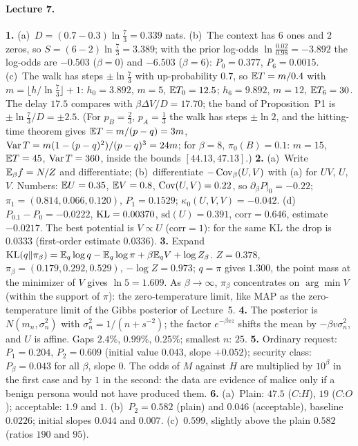 \paragraph{Lecture 7.}
\textbf{1.} (a)~$D=(0.7-0.3)\ln\frac73=0.339$ nats. (b)~The context has $6$ ones and $2$ zeros, so $S=(6-2)\ln\frac73=3.389$; with the prior log-odds $\ln\frac{0.02}{0.98}=-3.892$ the log-odds are $-0.503$ ($\beta=0$) and $-6.503$ ($\beta=6$): $P_0=0.377$, $P_6=0.0015$. (c)~The walk has steps $\pm\ln\frac73$ with up-probability $0.7$, so $\mathbb{E} T=m/0.4$ with $m=\lfloor h/\ln\frac73\rfloor+1$: $h_0=3.892$, $m=5$, $\mathbb{E} T_0=12.5$; $h_6=9.892$, $m=12$, $\mathbb{E} T_6=30$. The delay $17.5$ compares with $\beta\Delta V/D=17.70$; the band of Proposition~P1 is $\pm\ln\frac73/D=\pm2.5$. (For $p_B=\frac23$, $p_A=\frac13$ the walk has steps $\pm\ln2$, and the hitting-time theorem gives $\mathbb{E} T=m/(p-q)=3m$, $\operatorname{Var} T=m(1-(p-q)^2)/(p-q)^3=24m$; for $\beta=8$, $\pi_0(B)=0.1$: $m=15$, $\mathbb{E} T=45$, $\operatorname{Var} T=360$, inside the bounds $[44.13,47.13]$.) \quad
\textbf{2.} (a)~Write $\mathbb{E}_\beta f=N/Z$ and differentiate; (b)~differentiate $-\operatorname{Cov}_\beta(U,V)$ with (a) for $UV$, $U$, $V$. Numbers: $\mathbb{E} U=0.35$, $\mathbb{E} V=0.8$, $\operatorname{Cov}(U,V)=0.22$, so $\partial_\beta P|_0=-0.22$; $\pi_1=(0.814,0.066,0.120)$, $P_1=0.1529$; $\kappa_0(U,V,V)=-0.042$. (d)~$P_{0.1}-P_0=-0.0222$, $\operatorname{KL}=0.00370$, $\mathrm{sd}(U)=0.391$, $\mathrm{corr}=0.646$, estimate $-0.0217$. The best potential is $V\propto U$ ($\mathrm{corr}=1$): for the same KL the drop is $0.0333$ (first-order estimate $0.0336$). \quad
\textbf{3.} Expand $\operatorname{KL}(q\|\pi_\beta)=\mathbb{E}_q\log q-\mathbb{E}_q\log\pi+\beta\mathbb{E}_qV+\log Z_\beta$. $Z=0.378$, $\pi_\beta=(0.179,0.292,0.529)$, $-\log Z=0.973$; $q=\pi$ gives $1.300$, the point mass at the minimizer of $V$ gives $\ln5=1.609$. As $\beta\to\infty$, $\pi_\beta$ concentrates on $\arg\min V$ (within the support of $\pi$): the zero-temperature limit, like MAP as the zero-temperature limit of the Gibbs posterior of Lecture~5. \quad
\textbf{4.} The posterior is $N(m_n,\sigma_n^2)$ with $\sigma_n^2=1/(n+s^{-2})$; the factor $e^{-\beta vz}$ shifts the mean by $-\beta v\sigma_n^2$, and $U$ is affine. Gaps $2.4\%$, $0.99\%$, $0.25\%$; smallest $n$: $25$. \quad
\textbf{5.} Ordinary request: $P_1=0.204$, $P_2=0.609$ (initial value $0.043$, slope $+0.052$); security class: $P_\beta=0.043$ for all $\beta$, slope $0$. The odds of $M$ against $H$ are multiplied by $10^{\beta}$ in the first case and by $1$ in the second: the data are evidence of malice only if a benign persona would not have produced them. \quad
\textbf{6.} (a)~Plain: $47.5$ ($C$:$H$), $19$ ($C$:$O$); acceptable: $1.9$ and $1$. (b)~$P_2=0.582$ (plain) and $0.046$ (acceptable), baseline $0.0226$; initial slopes $0.044$ and $0.007$. (c)~$0.599$, slightly above the plain $0.582$ (ratios $190$ and $95$). \quad
